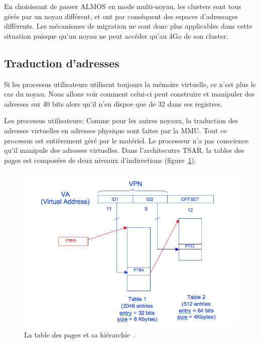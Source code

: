     En choisissant de passer ALMOS en mode multi-noyau, les clusters sont tous
    gérés par un noyau différent, et ont par conséquent des espaces d'adressages
    différents. Les mécanismes de migration ne sont donc plus applicables dans
    cette situation puisque qu'un noyau ne peut accéder qu'au 4Go de son
    cluster.


    \subsection{Traduction d'adresses}

      Si les processus utilisateurs utilisent toujours la mémoire virtuelle, ce
      n'est plus le cas du noyau. Nous allons voir comment celui-ci peut
      construire et manipuler des adresses sur 40 bits alors qu'il n'en dispoe
      que de 32 dans ses registres.

      \begin{paragraph}{Les processus utilisateurs:}
        Comme pour les autres noyaux, la traduction des adresses virtuelles en
        adresses physique sont faites par la MMU. Tout ce processus est
        entièrement géré par le matériel. Le processeur n'a pas conscience qu'il
        manipule des adresses virtuelles. Dans l'architecutre TSAR, la tables
        des pages est composées de deux niveaux d'indirections
        (figure~\ref{fig:page-table}).
        
        \begin{figure}[ht]
          \centering
          \includegraphics[scale=0.35]{include/img/pages_table_levels.png}
          \caption{La table des pages et sa
            hiérarchie~\citep{tsar2008web}.}
          \label{fig:page-table}
        \end{figure}
        \FloatBarrier
      \end{paragraph}
      
